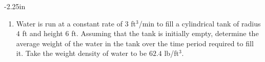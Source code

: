 \begin{adjustwidth*}{}{-2.25in}
\begin{multicols*}{2}
\begin{enumerate}[1),start=15]
\item Water is run at a constant rate of $3$ ft$^3$/min to fill a cylindrical tank of radius $4$ ft and height $6$ ft. Assuming that the tank is initially empty, determine the average weight of the water in the tank over the time period required to fill it. Take the weight density of water to be $62.4$ lb/ft$^3$.
\end{enumerate}

\end{multicols*}
\end{adjustwidth*}

%
%
%

\afterexercises